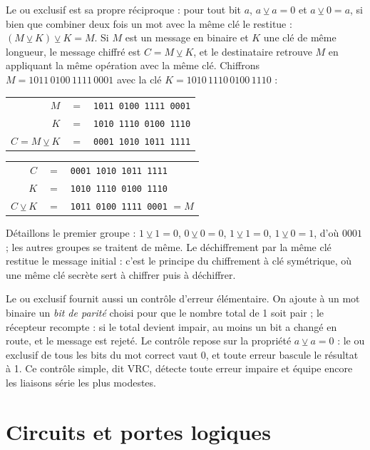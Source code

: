 \begin{exemple}
Le ou exclusif est sa propre réciproque : pour tout bit $a$, $a \veebar a = 0$ et $a \veebar 0 = a$, si bien que combiner deux fois un mot avec la même clé le restitue : $(M \veebar K) \veebar K = M$. Si $M$ est un message en binaire et $K$ une clé de même longueur, le message chiffré est $C = M \veebar K$, et le destinataire retrouve $M$ en appliquant la même opération avec la même clé. Chiffrons $M = 1011\,0100\,1111\,0001$ avec la clé $K = 1010\,1110\,0100\,1110$ :
\begin{center}
\begin{tabular}{rcl}
$M$ & $=$ & \texttt{1011 0100 1111 0001}\\
$K$ & $=$ & \texttt{1010 1110 0100 1110}\\
$C = M \veebar K$ & $=$ & \texttt{0001 1010 1011 1111}\\
\end{tabular}
\qquad
\begin{tabular}{rcl}
$C$ & $=$ & \texttt{0001 1010 1011 1111}\\
$K$ & $=$ & \texttt{1010 1110 0100 1110}\\
$C \veebar K$ & $=$ & \texttt{1011 0100 1111 0001} $= M$\\
\end{tabular}
\end{center}
Détaillons le premier groupe : $1 \veebar 1 = 0$, $0 \veebar 0 = 0$, $1 \veebar 1 = 0$, $1 \veebar 0 = 1$, d'où $0001$ ; les autres groupes se traitent de même. Le déchiffrement par la même clé restitue le message initial : c'est le principe du chiffrement à clé symétrique, où une même clé secrète sert à chiffrer puis à déchiffrer.
\end{exemple}

\begin{remarque}
Le ou exclusif fournit aussi un contrôle d'erreur élémentaire. On ajoute à un mot binaire un \emph{bit de parité} choisi pour que le nombre total de 1 soit pair ; le récepteur recompte : si le total devient impair, au moins un bit a changé en route, et le message est rejeté. Le contrôle repose sur la propriété $a \veebar a = 0$ : le ou exclusif de tous les bits du mot correct vaut 0, et toute erreur bascule le résultat à 1. Ce contrôle simple, dit VRC, détecte toute erreur impaire et équipe encore les liaisons série les plus modestes.
\end{remarque}

\section{Circuits et portes logiques}

